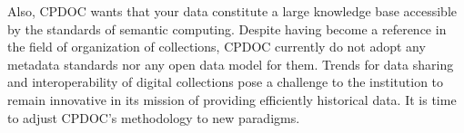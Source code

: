    
Also, CPDOC wants that your data constitute a large knowledge base
accessible by the standards of semantic computing. Despite having
become a reference in the field of organization of collections, CPDOC
currently do not adopt any metadata standards nor any open data model
for them. Trends for data sharing and interoperability of digital
collections pose a challenge to the institution to remain innovative
in its mission of providing efficiently historical data. It is time to
adjust CPDOC's methodology to new paradigms.
   

      
